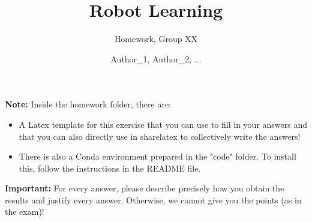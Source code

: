 \documentclass[
	ngerman,
	points=true,%
	]{tudaexercise}
\begin{document}
\newcommand{\todo}{\textbf{\textcolor{red}{TODO: your answer!}}}

\title[]{Robot Learning}
\subtitle{Homework, Group XX}
\author{Author\_1, Author\_2, ...}

\maketitle
\textbf{Note:} Inside the homework folder, there are:
\begin{itemize}
	\item A Latex template for this exercise that you can use to fill in your answers and that you can also directly use in sharelatex to collectively write the answers!
	\item There is also a Conda environment prepared in the "code" folder. To install this, follow the instructions in the README file.
\end{itemize}
\textbf{Important:} For every answer, please describe precisely how you obtain the results and justify every answer. Otherwise, we cannot give you the points (as in the exam)!
\end{document}

